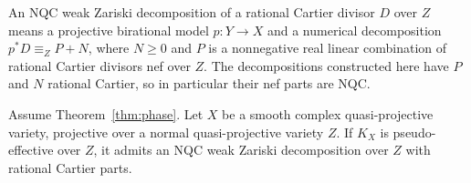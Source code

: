 An NQC weak Zariski decomposition of a rational Cartier divisor $D$ over
$Z$ means a projective birational model $p:Y\to X$ and a numerical
decomposition $p^*D\equiv_Z P+N$, where $N\geq0$ and $P$ is a nonnegative
real linear combination of rational Cartier divisors nef over $Z$.
The decompositions constructed here have $P$ and $N$ rational Cartier,
so in particular their nef parts are NQC.

\begin{proposition}\label{prop:relative-wzd}
Assume Theorem~\ref{thm:phase}.  Let $X$ be a smooth complex
quasi-projective variety, projective over a normal quasi-projective
variety $Z$.  If $K_X$ is pseudo-effective over $Z$, it admits an NQC weak
Zariski decomposition over $Z$ with rational Cartier parts.
\end{proposition}

